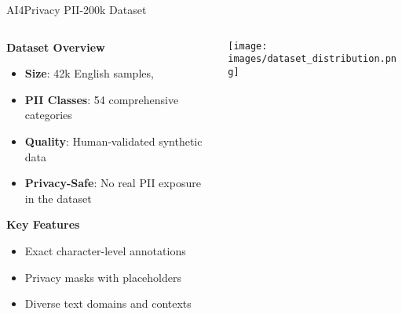 \documentclass[aspectratio=169]{beamer}
\begin{document}
\begin{frame}{AI4Privacy PII-200k Dataset}
\begin{columns}
\begin{column}{0.6\textwidth}
\textbf{Dataset Overview}
\begin{itemize}
\item \textbf{Size}: 42k English samples,
\item \textbf{PII Classes}: 54 comprehensive categories
\item \textbf{Quality}: Human-validated synthetic data
\item \textbf{Privacy-Safe}: No real PII exposure in the dataset
\end{itemize}

\vspace{0.3cm}
\textbf{Key Features}
\begin{itemize}
\item Exact character-level annotations
\item Privacy masks with placeholders
\item Diverse text domains and contexts
\end{itemize}
\end{column}
\begin{column}{0.4\textwidth}
\begin{center}
\texttt{[image: images/dataset\_distribution.png]}
\caption{PII Class Distribution}
\end{center}
\end{column}
\end{columns}
\end{frame}
\end{document}
